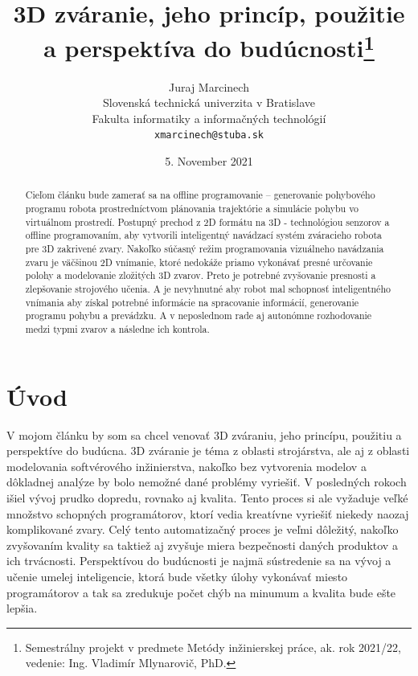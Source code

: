 \documentclass[10pt,twoside,slovak,a4paper]{article}
\title{3D zváranie, jeho princíp, použitie a perspektíva do budúcnosti\thanks{Semestrálny projekt v predmete Metódy inžinierskej práce, ak. rok 2021/22, 
vedenie: \newline Ing. Vladimír Mlynarovič, PhD.}}
\author{Juraj Marcinech\\[2pt]
	{\small Slovenská technická univerzita v Bratislave}\\
	{\small Fakulta informatiky a informačných technológií}\\
	{\small \texttt{xmarcinech@stuba.sk}}
	}
\date{\small 5. November 2021}
\begin{document}
\maketitle

\begin{abstract}

Cieľom článku bude zamerať sa na offline programovanie – generovanie pohybového programu robota
prostredníctvom plánovania trajektórie a simulácie pohybu vo virtuálnom prostredí. Postupný
prechod z 2D formátu na 3D - technológiou senzorov a offline programovaním, aby vytvorili
inteligentný navádzací systém zváracieho robota pre 3D zakrivené zvary. Nakoľko súčasný režim
programovania vizuálneho navádzania zvaru je väčšinou 2D vnímanie, ktoré nedokáže priamo
vykonávať presné určovanie polohy a modelovanie zložitých 3D zvarov. Preto je potrebné zvyšovanie
presnosti a zlepšovanie strojového učenia. A je nevyhnutné aby robot mal schopnosť inteligentného
vnímania aby získal potrebné informácie na spracovanie informácií, generovanie programu pohybu a
prevádzku. A v neposlednom rade aj autonómne rozhodovanie medzi typmi zvarov a následne ich
kontrola.

\end{abstract}



\section{Úvod}  %


V mojom článku by som sa chcel venovať 3D zváraniu, jeho princípu, použitiu a perspektíve do budúcna. 3D zváranie je téma z oblasti strojárstva, ale aj z oblasti modelovania softvérového inžinierstva, nakoľko bez vytvorenia modelov a dôkladnej analýze by bolo nemožné dané problémy vyriešiť.
V posledných rokoch išiel vývoj prudko dopredu, rovnako aj kvalita. Tento proces si ale vyžaduje veľké množstvo schopných programátorov, ktorí vedia kreatívne vyriešiť niekedy naozaj komplikované zvary. Celý tento automatizačný proces je veľmi dôležitý, nakoľko zvyšovaním kvality sa taktiež aj zvyšuje miera bezpečnosti daných produktov a ich trvácnosti.
Perspektívou do budúcnosti je najmä sústredenie sa na vývoj a učenie umelej inteligencie, ktorá bude všetky úlohy vykonávať miesto programátorov a tak sa zredukuje počet chýb na minumum a kvalita bude ešte lepšia.
\end{document}
